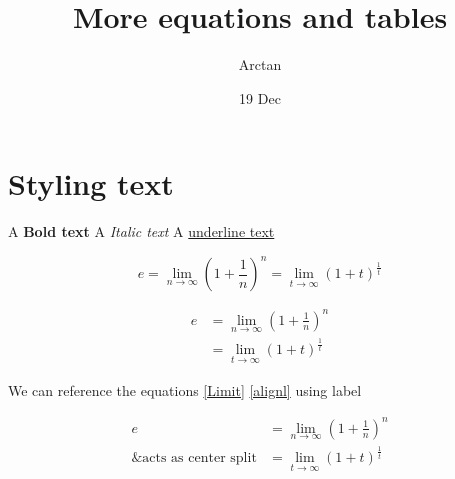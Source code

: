 \documentclass{article}
\title{More equations and tables}
\author{Arctan}
\date{19 Dec}
\begin{document}
\maketitle

\section{Styling text}

A \textbf{Bold text}
A \textit{Italic text}
A \underline{underline text}

    \begin{equation}
    \label{Limit}
        e = \lim_{n\to\infty}\left(1+\frac{1}{n}\right)^n
          = \lim_{t\to\infty}(1+t)^\frac{1}{t}
    \end{equation}

    \begin{align}
    \label{alignl}
        e& = \lim_{n\to\infty}\left(1+\frac{1}{n}\right)^n \\ 
          &= \lim_{t\to\infty}(1+t)^\frac{1}{t}
    \end{align}

    We can reference the equations \ref{Limit} \ref{alignl} using label 

    \begin{equation}
    \begin{split}
        e &= \lim_{n\to\infty}\left(1+\frac{1}{n}\right)^n \\
        \text{\& acts as center split}  &= \lim_{t\to\infty}(1+t)^\frac{1}{t}
    \end{split} 
    \end{equation}
\end{document}
